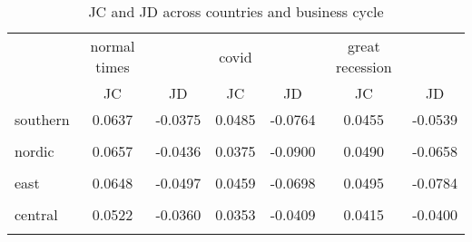 \begin{table}[htbp]\centering
\caption{JC and JD across countries and business cycle}
\begin{tabular}{l*{6}{c}}
\hline\hline
                    &normal times&            &       covid&            &great recession&            \\
                    &\multicolumn{1}{c}{JC}&\multicolumn{1}{c}{JD}&\multicolumn{1}{c}{JC}&\multicolumn{1}{c}{JD}&\multicolumn{1}{c}{JC}&\multicolumn{1}{c}{JD}\\
\hline
southern            &      0.0637&     -0.0375&      0.0485&     -0.0764&      0.0455&     -0.0539\\
                    &            &            &            &            &            &            \\
[1em]
nordic              &      0.0657&     -0.0436&      0.0375&     -0.0900&      0.0490&     -0.0658\\
                    &            &            &            &            &            &            \\
[1em]
east                &      0.0648&     -0.0497&      0.0459&     -0.0698&      0.0495&     -0.0784\\
                    &            &            &            &            &            &            \\
[1em]
central             &      0.0522&     -0.0360&      0.0353&     -0.0409&      0.0415&     -0.0400\\
                    &            &            &            &            &            &            \\
\hline\hline
\end{tabular}
\end{table}
